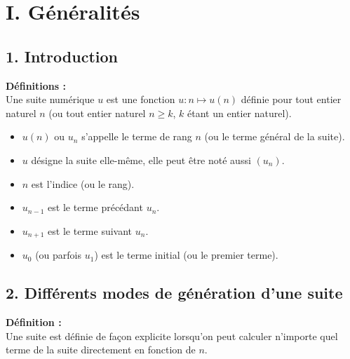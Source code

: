\documentclass[11pt,a4paper]{article}
\title{\doctitre}
\author{\docniveau \\ \doctheme - \doctype}
\date{}
\begin{document}
\maketitle
\pagestyle{custom}
\thispagestyle{custom}

\section*{I. Généralités}
\subsection*{1. Introduction}

\begin{mdframed}[style=definitionStyle]
  \textbf{Définitions :} ~\\
  Une suite numérique $u$ est une fonction $u:n \mapsto u(n)$ définie pour tout entier naturel $n$
  (ou tout entier naturel $n \geq k$, $k$ étant un entier naturel).
  \vspace{-4pt}
  \begin{itemize}
    \item  $u(n)$ ou $u_n$ s'appelle le terme de rang $n$ (ou le terme général de la suite).
    \item  $u$ désigne la suite elle-même, elle peut être noté aussi $(u_n)$.
    \item  $n$ est l'indice (ou le rang).
    \item  $u_{n-1}$ est le terme précédant $u_n$.
    \item  $u_{n+1}$ est le terme suivant $u_n$.
    \item  $u_0$ (ou parfois $u_1$) est le terme initial (ou le premier terme).
  \end{itemize}

\end{mdframed}

\subsection*{2. Différents modes de génération d'une suite}

\begin{mdframed}[style=definitionStyle]
  \textbf{Définition :} ~\\
  Une suite est définie de façon explicite lorsqu'on peut calculer n'importe quel terme de la suite directement en fonction de $n$.
\end{mdframed}
\end{document}
